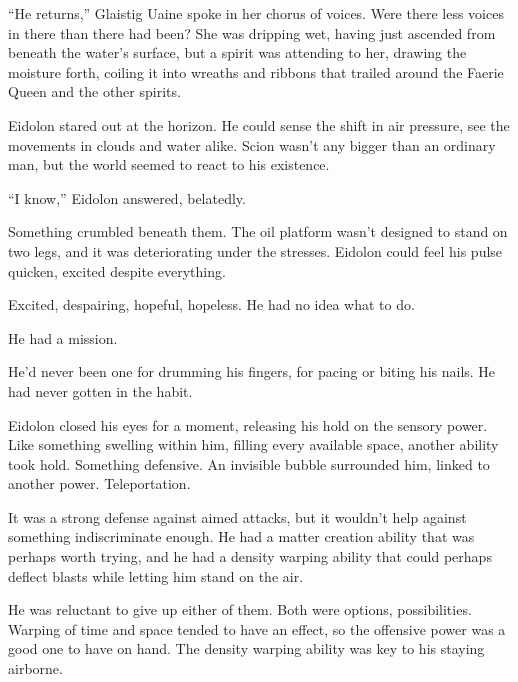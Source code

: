 








``He returns,'' Glaistig Uaine spoke in her chorus of voices.  Were there less voices in there than there had been?  She was dripping wet, having just ascended from beneath the water's surface, but a spirit was attending to her, drawing the moisture forth, coiling it into wreaths and ribbons that trailed around the Faerie Queen and the other spirits.



Eidolon stared out at the horizon.  He could sense the shift in air pressure, see the movements in clouds and water alike.  Scion wasn't any bigger than an ordinary man, but the world seemed to react to his existence.



``I know,'' Eidolon answered, belatedly.



Something crumbled beneath them.  The oil platform wasn't designed to stand on two legs, and it was deteriorating under the stresses.  Eidolon could feel his pulse quicken, excited despite everything.



Excited, despairing, hopeful, hopeless.  He had no idea what to do.



He had a mission.



He'd never been one for drumming his fingers, for pacing or biting his nails.  He had never gotten in the habit.



Eidolon closed his eyes for a moment, releasing his hold on the sensory power.  Like something swelling within him, filling every available space, another ability took hold.  Something defensive.  An invisible bubble surrounded him, linked to another power.  Teleportation.



It was a strong defense against aimed attacks, but it wouldn't help against something indiscriminate enough.  He had a matter creation ability that was perhaps worth trying, and he had a density warping ability that could perhaps deflect blasts while letting him stand on the air.



He was reluctant to give up either of them.  Both were options, possibilities.  Warping of time and space tended to have an effect, so the offensive power was a good one to have on hand.  The density warping ability was key to his staying airborne.



